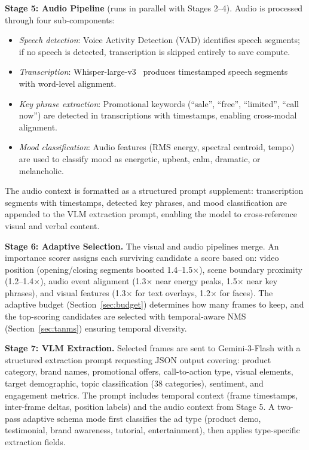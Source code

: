 \textbf{Stage 5: Audio Pipeline} (runs in parallel with Stages 2--4).
Audio is processed through four sub-components:
\begin{itemize}
    \item \textit{Speech detection}: Voice Activity Detection (VAD) identifies speech segments; if no speech is detected, transcription is skipped entirely to save compute.
    \item \textit{Transcription}: Whisper-large-v3~\cite{radford2022whisper} produces timestamped speech segments with word-level alignment.
    \item \textit{Key phrase extraction}: Promotional keywords (``sale'', ``free'', ``limited'', ``call now'') are detected in transcriptions with timestamps, enabling cross-modal alignment.
    \item \textit{Mood classification}: Audio features (RMS energy, spectral centroid, tempo) are used to classify mood as energetic, upbeat, calm, dramatic, or melancholic.
\end{itemize}

The audio context is formatted as a structured prompt supplement: transcription segments with timestamps, detected key phrases, and mood classification are appended to the VLM extraction prompt, enabling the model to cross-reference visual and verbal content.

\textbf{Stage 6: Adaptive Selection.} The visual and audio pipelines merge. An importance scorer assigns each surviving candidate a score based on: video position (opening/closing segments boosted 1.4--1.5$\times$), scene boundary proximity (1.2--1.4$\times$), audio event alignment (1.3$\times$ near energy peaks, 1.5$\times$ near key phrases), and visual features (1.3$\times$ for text overlays, 1.2$\times$ for faces). The adaptive budget (Section~\ref{sec:budget}) determines how many frames to keep, and the top-scoring candidates are selected with temporal-aware NMS (Section~\ref{sec:tanms}) ensuring temporal diversity.

\textbf{Stage 7: VLM Extraction.} Selected frames are sent to Gemini-3-Flash with a structured extraction prompt requesting JSON output covering: product category, brand names, promotional offers, call-to-action type, visual elements, target demographic, topic classification (38 categories), sentiment, and engagement metrics. The prompt includes temporal context (frame timestamps, inter-frame deltas, position labels) and the audio context from Stage 5. A two-pass adaptive schema mode first classifies the ad type (product demo, testimonial, brand awareness, tutorial, entertainment), then applies type-specific extraction fields.

